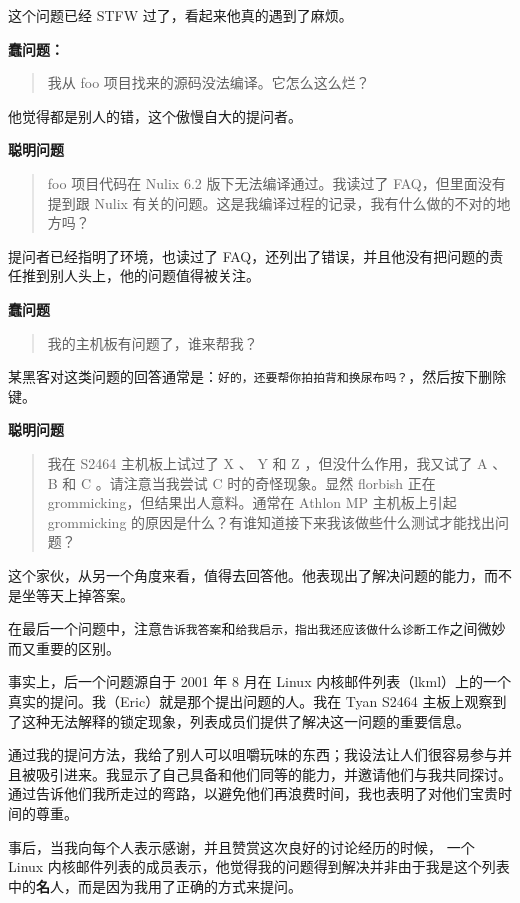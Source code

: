 \documentclass[titlepage]{article}
\begin{document}
这个问题已经 STFW 过了，看起来他真的遇到了麻烦。

\textbf{蠢问题：}

\begin{quote}
我从 foo 项目找来的源码没法编译。它怎么这么烂？
\end{quote}

他觉得都是别人的错，这个傲慢自大的提问者。

\textbf{聪明问题}

\begin{quote}
foo 项目代码在 Nulix 6.2 版下无法编译通过。我读过了
FAQ，但里面没有提到跟 Nulix
有关的问题。这是我编译过程的记录，我有什么做的不对的地方吗？
\end{quote}

提问者已经指明了环境，也读过了
FAQ，还列出了错误，并且他没有把问题的责任推到别人头上，他的问题值得被关注。

\textbf{蠢问题}

\begin{quote}
我的主机板有问题了，谁来帮我？
\end{quote}

某黑客对这类问题的回答通常是：\texttt{好的，还要帮你拍拍背和换尿布吗？}，然后按下删除键。

\textbf{聪明问题}

\begin{quote}
我在 S2464 主机板上试过了 X 、 Y 和 Z ，但没什么作用，我又试了 A 、 B 和
C 。请注意当我尝试 C 时的奇怪现象。显然 florbish 正在
grommicking，但结果出人意料。通常在 Athlon MP 主机板上引起 grommicking
的原因是什么？有谁知道接下来我该做些什么测试才能找出问题？
\end{quote}

这个家伙，从另一个角度来看，值得去回答他。他表现出了解决问题的能力，而不是坐等天上掉答案。

在最后一个问题中，注意\texttt{告诉我答案}和\texttt{给我启示，指出我还应该做什么诊断工作}之间微妙而又重要的区别。

事实上，后一个问题源自于 2001 年 8 月在 Linux
内核邮件列表（lkml）上的一个真实的提问。我（Eric）就是那个提出问题的人。我在
Tyan S2464
主板上观察到了这种无法解释的锁定现象，列表成员们提供了解决这一问题的重要信息。

通过我的提问方法，我给了别人可以咀嚼玩味的东西；我设法让人们很容易参与并且被吸引进来。我显示了自己具备和他们同等的能力，并邀请他们与我共同探讨。通过告诉他们我所走过的弯路，以避免他们再浪费时间，我也表明了对他们宝贵时间的尊重。

事后，当我向每个人表示感谢，并且赞赏这次良好的讨论经历的时候， 一个
Linux
内核邮件列表的成员表示，他觉得我的问题得到解决并非由于我是这个列表中的\textbf{名}人，而是因为我用了正确的方式来提问。
\end{document}
